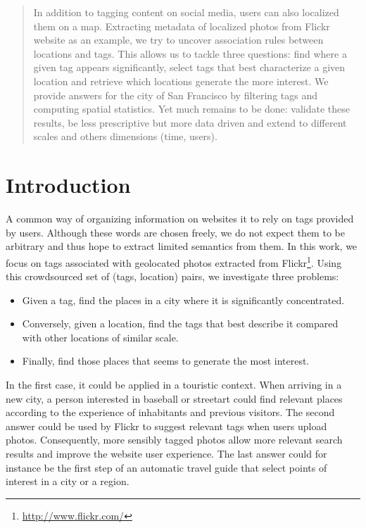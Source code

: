 \begin{abstract}

In addition to tagging content on social media, users can also localized them
on a map. Extracting metadata of localized photos from Flickr website as an
example, we try to uncover association rules between locations and tags. This
allows us to tackle three questions: find where a given tag appears
significantly, select tags that best characterize a given location and
retrieve which locations generate the more interest. We provide answers for
the city of San Francisco by filtering tags and computing spatial statistics.
Yet much remains to be done: validate these results, be less prescriptive but
more data driven and extend to different scales and others dimensions (time,
users).

\end{abstract}

\section{Introduction}

A common way of organizing information on websites it to rely on tags provided
by users. Although these words are chosen freely, we do not expect them to be
arbitrary and thus hope to extract limited semantics from them. In this work,
we focus on tags associated with geolocated photos extracted from
Flickr\footnote{\href{https://secure.flickr.com/}{http://www.flickr.com/}}.
Using this crowdsourced set of (tags, location) pairs, we investigate three
problems:

\begin{itemize}
	\item Given a tag, find the places in a city where it is significantly
		concentrated.
	\item Conversely, given a location, find the tags that best describe it
		compared with other locations of similar scale.
	\item Finally, find those places that seems to generate the most interest.
\end{itemize}

In the first case, it could be applied in a touristic context. When arriving
in a new city, a person interested in \textsf{baseball} or \textsf{streetart}
could find relevant places according to the experience of inhabitants and
previous visitors. The second answer could be used by Flickr to suggest
relevant tags when users upload photos. Consequently, more sensibly tagged
photos allow more relevant search results and improve the website user
experience. The last answer could for instance be the first step of an
automatic travel guide that select points of interest in a city or a region.

